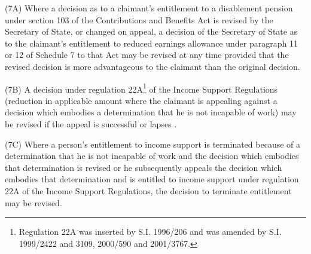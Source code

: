 \documentclass[12pt,a4paper]{article}
\begin{document}
(7A) Where a decision as to a claimant’s entitlement to a disablement pension under section 103 of the Contributions and Benefits Act is revised by the Secretary of State, or changed on appeal, a decision of the Secretary of State as to the claimant’s entitlement to reduced earnings allowance under paragraph 11 or 12 of Schedule 7 to that Act may be revised at any time provided that the revised decision is more advantageous to the claimant than the original decision.

(7B) A decision under regulation 22A\footnote{Regulation 22A was inserted by S.I. 1996/206 and was amended by S.I. 1999/2422 and 3109, 2000/590 and 2001/3767.} of the Income Support Regulations (reduction in applicable amount where the claimant is appealing against a decision which embodies a determination that he is not incapable of work) may be revised if the appeal is successful
or lapses%
.

(7C) Where a person’s entitlement to income support is terminated because of a determination that he is not incapable of work and 
the decision which embodies that determination is revised or  %
he subsequently appeals the decision 
which embodies  %
that determination and is entitled to income support under regulation 22A of the Income Support Regulations, the decision to terminate entitlement may be revised.
\end{document}
